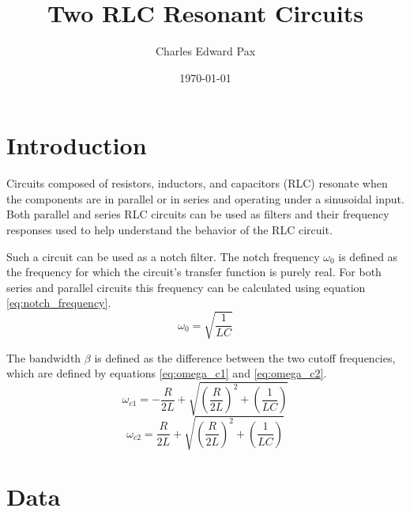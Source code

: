 \documentclass[11pt,onecolumn]{article}
\begin{document}
\title{Two RLC Resonant Circuits}
\date{\today}
\author{Charles Edward Pax}
\maketitle


\section{Introduction}\label{sec:Introduction}
Circuits composed of resistors, inductors, and capacitors (RLC) resonate when the components are in parallel or in series and operating under a sinusoidal input. Both parallel and series RLC circuits can be used as filters and their frequency responses used to help understand the behavior of the RLC circuit.

Such a circuit can be used as a notch filter. The notch frequency  $\omega_0$ is defined as the frequency for which the circuit's transfer function is purely real\cite{Electric_Circuits}. For both series and parallel circuits this frequency can be calculated using equation \ref{eq:notch_frequency}.
\begin{equation}\label{eq:notch_frequency}
\omega_0 = \sqrt{\frac{1}{L C}}
\end{equation}

The bandwidth $\beta$ is defined as the difference between the two cutoff frequencies, which are defined by equations \ref{eq:omega_c1} and \ref{eq:omega_c2}\cite{Electric_Circuits}.
\begin{equation}\label{eq:omega_c1}
\omega_{c1} = -\frac{R}{2L} + \sqrt{\left( \frac{R}{2L} \right)^2 + \left( \frac{1}{L C} \right)}
\end{equation}
\begin{equation}\label{eq:omega_c2}
\omega_{c2} = \frac{R}{2L} + \sqrt{\left( \frac{R}{2L} \right)^2 + \left( \frac{1}{L C} \right)}
\end{equation}

\section{Data}\label{sec:Data}
\end{document}
